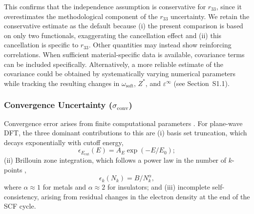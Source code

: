 \documentclass[twocolumn,superscriptaddress,amsmath,amssymb,longbibliography]{revtex4-2}
\newcommand{\Ecut}{E_{\mathrm{cut}}}
\newcommand{\conv}{\mathrm{conv}}
\newcommand{\Nk}{N_k}
\begin{document}
This confirms that the independence  assumption is conservative for $r_{33}$, since it overestimates the methodological component of the $r_{33}$ uncertainty. We retain the conservative estimate as the default because (i) the present comparison is based on only two functionals, exaggerating the cancellation effect and (ii) this cancellation is specific to
$r_{33}$. Other quantities may instead show reinforcing correlations. When sufficient material-specific data is available, covariance terms can be included specifically.
Alternatively, a more reliable estimate of the covariance could be obtained by systematically varying numerical parameters while tracking the resulting changes in
$\omega_{\mathrm{soft}}$, $Z^*$, and $\varepsilon^\infty$  (see  Section~S1.1).

\subsubsection{Convergence Uncertainty ($\sigma_\conv$)}

Convergence error arises from finite computational
parameters \cite{Payne1992}. For plane-wave DFT, the three dominant
contributions to this are (i) basis set truncation, which decays exponentially with
cutoff energy,
\begin{equation}
    \epsilon_{\Ecut}(E) = A_E \exp\left(-E / E_0\right);
    \label{eq:cutoff_error}
\end{equation}
(ii) Brillouin zone integration, which follows a power law in the number of
$k$-points \cite{Wisesa2016,Monkhorst1976},
\begin{equation}
    \epsilon_k(\Nk) = B / \Nk^{\alpha},
    \label{eq:kpoint_error}
\end{equation}
where $\alpha \approx 1$ for metals and $\alpha \approx 2$ for insulators; and (iii)
 incomplete self-consistency, arising from residual changes in the electron density at the end of the SCF cycle.
\end{document}
